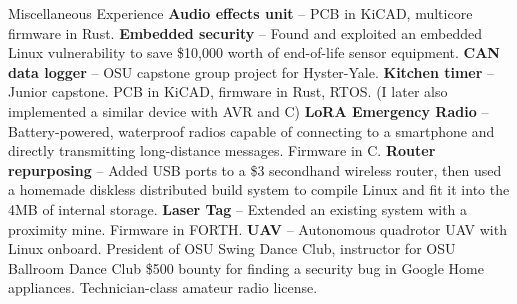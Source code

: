 \begin{rubric}{Miscellaneous Experience}
%
  \entry*[2023] \textbf{Audio effects unit} -- PCB in KiCAD, multicore firmware in Rust.
%
  \entry*[2023] \textbf{Embedded security} -- Found and exploited an embedded Linux vulnerability to save \$10,000 worth of end-of-life sensor equipment.
%
  \entry*[2022] \textbf{CAN data logger} -- OSU capstone group project for Hyster-Yale.
%
  \entry*[2022] \textbf{Kitchen timer} -- Junior capstone. PCB in KiCAD, firmware in Rust, RTOS. \hfill\break (I later also implemented a similar device with AVR and C)
%
  \entry*[2022] \textbf{LoRA Emergency Radio} -- Battery-powered, waterproof radios capable of connecting to a smartphone and directly transmitting long-distance messages. Firmware in C.
%
  \entry*[2019] \textbf{Router repurposing} -- Added USB ports to a \$3 secondhand wireless router, then used a homemade diskless distributed build system to compile Linux and fit it into the 4MB of internal storage.
%
  \entry*[$\cdots\cdot$] \textbf{Laser Tag} -- Extended an existing system with a proximity mine. Firmware in FORTH.
%
  \entry*[$\cdots\cdot$] \textbf{UAV} -- Autonomous quadrotor UAV with Linux onboard.
\entry*[2020 -- 2023] President of OSU Swing Dance Club, instructor for OSU Ballroom Dance Club
\entry*[2020] \$500 bounty for finding a security bug in Google Home appliances.
\entry*[] Technician-class amateur radio license.

\end{rubric}
